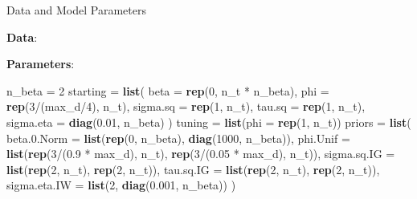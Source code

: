 \documentclass[11pt,ignorenonframetext,]{beamer}
\newenvironment{Shaded}{}{}
\newcommand{\DataTypeTok}[1]{\textcolor[rgb]{0.56,0.13,0.00}{#1}}
\newcommand{\DecValTok}[1]{\textcolor[rgb]{0.25,0.63,0.44}{#1}}
\newcommand{\FloatTok}[1]{\textcolor[rgb]{0.25,0.63,0.44}{#1}}
\newcommand{\KeywordTok}[1]{\textcolor[rgb]{0.00,0.44,0.13}{\textbf{#1}}}
\newcommand{\NormalTok}[1]{#1}
\newcommand{\OperatorTok}[1]{\textcolor[rgb]{0.40,0.40,0.40}{#1}}
\newcommand{\StringTok}[1]{\textcolor[rgb]{0.25,0.44,0.63}{#1}}
\let\oldShaded\Shaded
\let\endoldShaded\endShaded
\renewenvironment{Shaded}{\footnotesize\begin{spacing}{0.9}\oldShaded}{\endoldShaded\end{spacing}}
\let\oldverbatim\verbatim
\let\endoldverbatim\endverbatim
\newcommand{\scriptoutput}{
  \renewenvironment{Shaded}{\scriptsize\begin{spacing}{0.9}\oldShaded}{\endoldShaded\end{spacing}}
  \renewenvironment{verbatim}{\scriptsize\begin{spacing}{0.9}\oldverbatim}{\endoldverbatim\end{spacing}}
}
\begin{document}
\begin{frame}[fragile]{Data and Model Parameters}
\protect\hypertarget{data-and-model-parameters}{}

\textbf{Data}: \scriptoutput

\begin{Shaded}
\end{Shaded}

\textbf{Parameters}: \scriptoutput

\begin{Shaded}
\begin{Highlighting}[]
\NormalTok{n_beta =}\StringTok{ }\DecValTok{2}
\NormalTok{starting =}\StringTok{ }\KeywordTok{list}\NormalTok{(}
  \DataTypeTok{beta =} \KeywordTok{rep}\NormalTok{(}\DecValTok{0}\NormalTok{, n_t }\OperatorTok{*}\StringTok{ }\NormalTok{n_beta), }\DataTypeTok{phi =} \KeywordTok{rep}\NormalTok{(}\DecValTok{3}\OperatorTok{/}\NormalTok{(max_d}\OperatorTok{/}\DecValTok{4}\NormalTok{), n_t),}
  \DataTypeTok{sigma.sq =} \KeywordTok{rep}\NormalTok{(}\DecValTok{1}\NormalTok{, n_t), }\DataTypeTok{tau.sq =} \KeywordTok{rep}\NormalTok{(}\DecValTok{1}\NormalTok{, n_t), }
  \DataTypeTok{sigma.eta =} \KeywordTok{diag}\NormalTok{(}\FloatTok{0.01}\NormalTok{, n_beta)}
\NormalTok{)}
\NormalTok{tuning =}\StringTok{ }\KeywordTok{list}\NormalTok{(}\DataTypeTok{phi =} \KeywordTok{rep}\NormalTok{(}\DecValTok{1}\NormalTok{, n_t))}
\NormalTok{priors =}\StringTok{ }\KeywordTok{list}\NormalTok{(}
  \DataTypeTok{beta.0.Norm =} \KeywordTok{list}\NormalTok{(}\KeywordTok{rep}\NormalTok{(}\DecValTok{0}\NormalTok{, n_beta), }\KeywordTok{diag}\NormalTok{(}\DecValTok{1000}\NormalTok{, n_beta)), }
  \DataTypeTok{phi.Unif =} \KeywordTok{list}\NormalTok{(}\KeywordTok{rep}\NormalTok{(}\DecValTok{3}\OperatorTok{/}\NormalTok{(}\FloatTok{0.9} \OperatorTok{*}\StringTok{ }\NormalTok{max_d), n_t), }\KeywordTok{rep}\NormalTok{(}\DecValTok{3}\OperatorTok{/}\NormalTok{(}\FloatTok{0.05} \OperatorTok{*}\StringTok{ }\NormalTok{max_d), n_t)), }
  \DataTypeTok{sigma.sq.IG =} \KeywordTok{list}\NormalTok{(}\KeywordTok{rep}\NormalTok{(}\DecValTok{2}\NormalTok{, n_t), }\KeywordTok{rep}\NormalTok{(}\DecValTok{2}\NormalTok{, n_t)), }
  \DataTypeTok{tau.sq.IG =} \KeywordTok{list}\NormalTok{(}\KeywordTok{rep}\NormalTok{(}\DecValTok{2}\NormalTok{, n_t), }\KeywordTok{rep}\NormalTok{(}\DecValTok{2}\NormalTok{, n_t)),}
  \DataTypeTok{sigma.eta.IW =} \KeywordTok{list}\NormalTok{(}\DecValTok{2}\NormalTok{, }\KeywordTok{diag}\NormalTok{(}\FloatTok{0.001}\NormalTok{, n_beta))}
\NormalTok{)}
\end{Highlighting}
\end{Shaded}

\end{frame}
\end{document}
